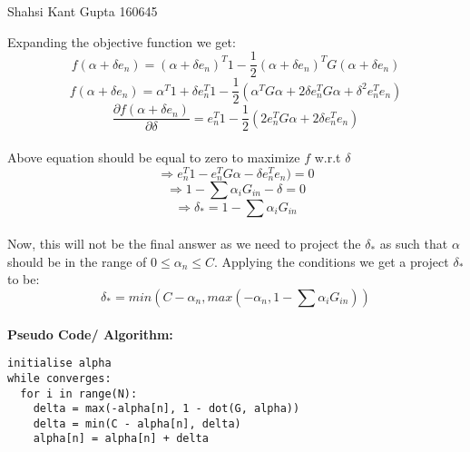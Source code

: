 \documentclass[a4paper,11pt]{article}
\begin{document}
{Shahsi Kant Gupta}   %
{160645}	%

\begin{mlsolution}
\noindent
Expanding the objective function we get:
\begin{equation}
  f(\alpha + \delta e_{n}) = (\alpha + \delta e_{n})^{T}1 - \frac{1}{2}(\alpha + \delta e_{n})^{T}G(\alpha + \delta e_{n})
\end{equation}
\begin{equation}
  f(\alpha + \delta e_{n}) = \alpha^{T}1 + \delta e_{n}^{T}1 - \frac{1}{2}(\alpha^{T}G\alpha + 2\delta e_{n}^{T}G\alpha + \delta^{2} e_{n}^{T}e_{n})
\end{equation}
\begin{equation}
  \frac{\partial{f(\alpha + \delta e_{n})}}{\partial{\delta}} = e_{n}^{T}1 - \frac{1}{2}(2e_{n}^{T}G\alpha + 2\delta e_{n}^{T}e_{n})
\end{equation} \\
Above equation should be equal to zero to maximize $f$ w.r.t $\delta$
\begin{equation}
  \Rightarrow e_{n}^{T}1 - e_{n}^{T}G\alpha - \delta e_{n}^{T}e_{n}) = 0
\end{equation}
\begin{equation}
  \Rightarrow 1 - \sum{\alpha_{i}G_{in}} - \delta = 0
\end{equation}
\begin{equation}
  \Rightarrow \delta_{*} = 1 - \sum{\alpha_{i}G_{in}}
\end{equation} \\
Now, this will not be the final answer as we need to project the $\delta_{*}$ as such that $\alpha$ should be in the range of $0 \leq \alpha_{n} \leq C$. Applying the conditions we get a project $\delta_{*}$ to be:
\begin{equation}
  \delta_{*} = min(C - \alpha_{n}, max(-\alpha_{n}, 1 - \sum{\alpha_{i}G_{in}}))
\end{equation} \\
\textbf{Pseudo Code/ Algorithm:}
\begin{lstlisting}[python]
initialise alpha
while converges:
  for i in range(N):
    delta = max(-alpha[n], 1 - dot(G, alpha))
    delta = min(C - alpha[n], delta)
    alpha[n] = alpha[n] + delta

\end{lstlisting}
\end{mlsolution}
\end{document}
